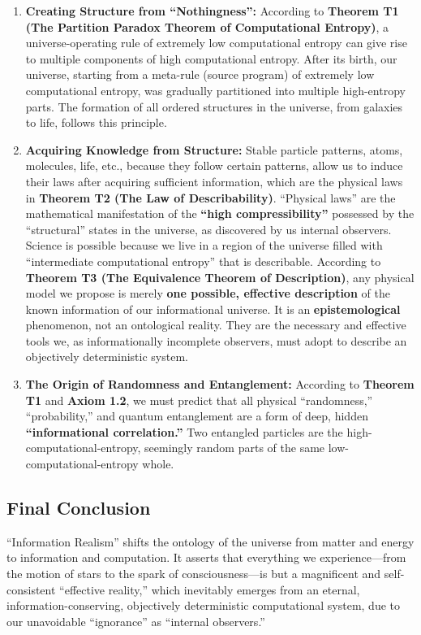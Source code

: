 \documentclass[11pt, a4paper]{article}
\begin{document}
\begin{enumerate}
    \item \textbf{Creating Structure from ``Nothingness'':}
    According to \textbf{Theorem T1 (The Partition Paradox Theorem of Computational Entropy)}, a universe-operating rule of extremely low computational entropy can give rise to multiple components of high computational entropy. After its birth, our universe, starting from a meta-rule (source program) of extremely low computational entropy, was gradually partitioned into multiple high-entropy parts. The formation of all ordered structures in the universe, from galaxies to life, follows this principle.

    \item \textbf{Acquiring Knowledge from Structure:}
    Stable particle patterns, atoms, molecules, life, etc., because they follow certain patterns, allow us to induce their laws after acquiring sufficient information, which are the physical laws in \textbf{Theorem T2 (The Law of Describability)}.
    ``Physical laws'' are the mathematical manifestation of the \textbf{``high compressibility''} possessed by the ``structural'' states in the universe, as discovered by us internal observers. Science is possible because we live in a region of the universe filled with ``intermediate computational entropy'' that is describable.
    According to \textbf{Theorem T3 (The Equivalence Theorem of Description)}, any physical model we propose is merely \textbf{one possible, effective description} of the known information of our informational universe. It is an \textbf{epistemological} phenomenon, not an ontological reality. They are the necessary and effective tools we, as informationally incomplete observers, must adopt to describe an objectively deterministic system.

    \item \textbf{The Origin of Randomness and Entanglement:}
    According to \textbf{Theorem T1} and \textbf{Axiom 1.2}, we must predict that all physical ``randomness,'' ``probability,'' and quantum entanglement are a form of deep, hidden \textbf{``informational correlation.''} Two entangled particles are the high-computational-entropy, seemingly random parts of the same low-computational-entropy whole.
\end{enumerate}

\subsection*{Final Conclusion}
``Information Realism'' shifts the ontology of the universe from matter and energy to information and computation. It asserts that everything we experience—from the motion of stars to the spark of consciousness—is but a magnificent and self-consistent ``effective reality,'' which inevitably emerges from an eternal, information-conserving, objectively deterministic computational system, due to our unavoidable ``ignorance'' as ``internal observers.''
\end{document}

